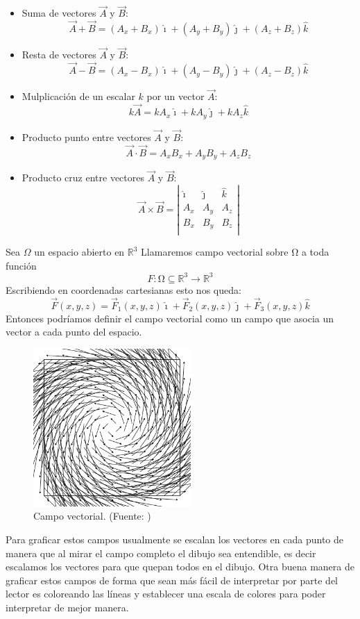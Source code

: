 \documentclass[11pt]{article}
\begin{document}
\begin{itemize}
\item Suma de vectores $\vec{A}$ y $\vec{B}$:
$$\vec{A}+\vec{B}=(A_x+B_x)\hat{\imath}+(A_y+B_y)\hat{\jmath}+(A_z+B_z)\hat{k}$$
\item Resta de vectores $\vec{A}$ y $\vec{B}$:
$$\vec{A}-\vec{B}=(A_x-B_x)\hat{\imath}+(A_y-B_y)\hat{\jmath}+(A_z-B_z)\hat{k}$$
\item Mulplicación de un escalar $k$ por un vector $\vec{A}$:
$$k\vec{A}= kA_x \hat{\imath}+kA_y\hat{\jmath}+kA_z\hat{k}$$
\item Producto punto entre vectores $\vec{A}$ y $\vec{B}$:
$$\vec{A} \cdot \vec{B}= A_xB_x+A_yB_y+A_zB_z$$
\item Producto cruz entre vectores $\vec{A}$ y $\vec{B}$:
$$\vec{A} \times \vec{B}= \left| {\begin{array}{ccc}
   \hat{\imath} & \hat{\jmath} & \hat{k} \\
   A_x & A_y & A_z\\
   B_x & B_y & B_z\\
  \end{array} } \right|$$
\end{itemize}
Sea $\Omega$ un espacio abierto en $\mathbb{R}^3$ 
Llamaremos campo vectorial sobre Ω a toda función $$F : Ω ⊆ \mathbb{R}^3\rightarrow\mathbb{R}^3$$
Escribiendo en coordenadas cartesianas esto nos queda:
$$\vec{F}(x,y,z)=\vec{F}_1(x,y,z)\hat{\imath}+\vec{F}_2(x,y,z)\hat{\jmath}+\vec{F}_3(x,y,z)\hat{k}$$
Entonces podríamos definir el campo vectorial como un campo que asocia un vector a cada punto del espacio.
\begin{figure}[H]
\centering
\includegraphics[height=6cm]{Imagenes/campovec.png}
\caption{Campo vectorial. (Fuente: \cite{WikipediaVectorial})}\label{fig:Campo vectorial}
\end{figure}
Para graficar estos campos usualmente se escalan los vectores en cada punto de manera que al mirar el campo completo el dibujo sea entendible, es decir escalamos los vectores para que quepan todos en el dibujo. Otra buena manera de graficar estos campos de forma que sean más fácil de interpretar por parte del lector es coloreando las líneas y establecer una escala de colores para poder interpretar de mejor manera.
\end{document}

